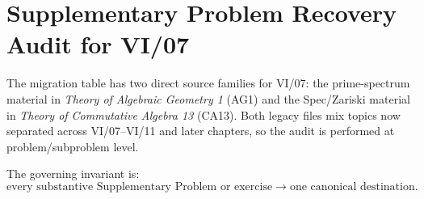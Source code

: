 \chapter*{Supplementary Problem Recovery Audit for VI/07}

The migration table has two direct source families for VI/07: the prime-spectrum material in
\emph{Theory of Algebraic Geometry 1} (AG1) and the Spec/Zariski material in
\emph{Theory of Commutative Algebra 13} (CA13).  Both legacy files mix topics now separated
across VI/07--VI/11 and later chapters, so the audit is performed at problem/subproblem level.

The governing invariant is:
\[
\text{every substantive Supplementary Problem or exercise}
\longrightarrow
\text{one canonical destination}.
\]

